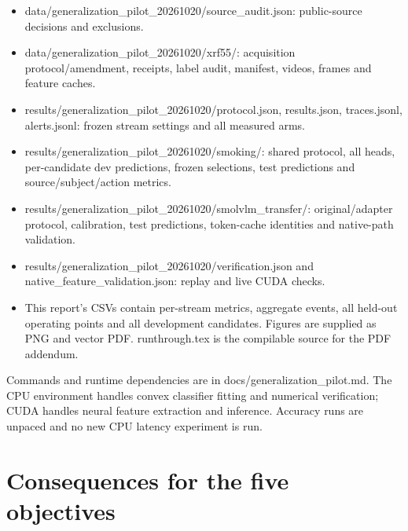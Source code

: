 \documentclass[10pt,a4paper]{article}
\begin{document}
\begin{itemize}
\item data/generalization\_pilot\_20261020/source\_audit.json: public-source decisions and exclusions.
\item data/generalization\_pilot\_20261020/xrf55/: acquisition protocol/amendment, receipts, label audit, manifest, videos, frames and feature caches.
\item results/generalization\_pilot\_20261020/protocol.json, results.json, traces.jsonl, alerts.jsonl: frozen stream settings and all measured arms.
\item results/generalization\_pilot\_20261020/smoking/: shared protocol, all heads, per-candidate dev predictions, frozen selections, test predictions and source/subject/action metrics.
\item results/generalization\_pilot\_20261020/smolvlm\_transfer/: original/adapter protocol, calibration, test predictions, token-cache identities and native-path validation.
\item results/generalization\_pilot\_20261020/verification.json and native\_feature\_validation.json: replay and live CUDA checks.
\item This report's CSVs contain per-stream metrics, aggregate events, all held-out operating points and all development candidates. Figures are supplied as PNG and vector PDF. runthrough.tex is the compilable source for the PDF addendum.
\end{itemize}
Commands and runtime dependencies are in docs/generalization\_pilot.md. The CPU environment handles convex classifier fitting and numerical verification; CUDA handles neural feature extraction and inference. Accuracy runs are unpaced and no new CPU latency experiment is run.

\section{Consequences for the five objectives}
\end{document}
